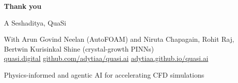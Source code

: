 \documentclass[aspectratio=169,10pt]{beamer}
\begin{document}
\begin{frame}[plain]
\vspace{0.9cm}
\begin{minipage}{0.76\textwidth}
{\color{white}\fontsize{30}{36}\selectfont\bfseries Thank you\par}
\vspace{0.3cm}
{\color{white!85}\large A Seshaditya, QuaSi\par}
\vspace{0.25cm}
{\color{white!75}\small
With Arun Govind Neelan (AutoFOAM) and Niruta Chapagain, Rohit Raj,\\
Bertwin Kurisinkal Shine (crystal-growth PINNs)\\[2mm]
\href{https://quasi.digital}{quasi.digital}\quad
\href{https://github.com/adytiaa/quasi.ai}{github.com/adytiaa/quasi.ai}\quad
\href{https://adytiaa.github.io/quasi.ai/}{adytiaa.github.io/quasi.ai}\par}
\vfill
{\color{white!65}\small Physics-informed and agentic AI for accelerating CFD simulations\par}
\end{minipage}
\end{frame}
\end{document}
